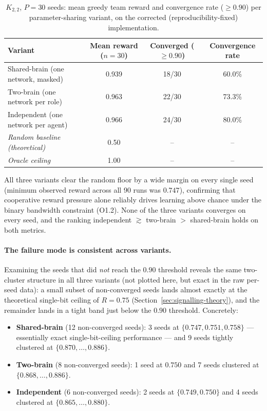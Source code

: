 \documentclass[a4paper,twoside,12pt]{report}
\begin{document}
\begin{table}[H]
\centering
\caption{$K_{2,2}$, $P=30$ seeds: mean greedy team reward and convergence
rate ($\geq 0.90$) per parameter-sharing variant, on the corrected
(reproducibility-fixed) implementation.}
\label{tab:q1-variant-comparison}
\renewcommand{\arraystretch}{1.25}
\begin{tabular}{lccc}
\toprule
\textbf{Variant} & \textbf{Mean reward ($n=30$)} & \textbf{Converged ($\geq 0.90$)} & \textbf{Convergence rate} \\
\midrule
Shared-brain (one network, masked)   & 0.939 & 18/30 & 60.0\% \\
Two-brain (one network per role)     & 0.963 & 22/30 & 73.3\% \\
Independent (one network per agent)  & 0.966 & 24/30 & 80.0\% \\
\midrule
\emph{Random baseline (theoretical)} & 0.50  & --    & -- \\
\emph{Oracle ceiling}                & 1.00  & --    & -- \\
\bottomrule
\end{tabular}
\end{table}

All three variants clear the random floor by a wide margin on every single
seed (minimum observed reward across all 90 runs was $0.747$), confirming
that cooperative reward pressure alone reliably drives learning above chance
under the binary bandwidth constraint (O1.2). None of the three variants
converges on every seed, and the ranking independent $\gtrsim$ two-brain $>$
shared-brain holds on both metrics.

\paragraph{The failure mode is consistent across variants.} Examining the
seeds that did \emph{not} reach the $0.90$ threshold reveals the same
two-cluster structure in all three variants (not plotted here, but exact in
the raw per-seed data): a small subset of non-converged seeds lands almost
exactly at the theoretical
single-bit ceiling of $R = 0.75$ (Section~\ref{sec:signalling-theory}), and
the remainder lands in a tight band just below the $0.90$ threshold.
Concretely:

\begin{itemize}
    \item \textbf{Shared-brain} (12 non-converged seeds): 3 seeds at
    $\{0.747, 0.751, 0.758\}$ --- essentially exact single-bit-ceiling
    performance --- and 9 seeds tightly clustered at $\{0.870,\ldots,0.886\}$.
    \item \textbf{Two-brain} (8 non-converged seeds): 1 seed at $0.750$ and
    7 seeds clustered at $\{0.868,\ldots,0.886\}$.
    \item \textbf{Independent} (6 non-converged seeds): 2 seeds at
    $\{0.749, 0.750\}$ and 4 seeds clustered at $\{0.865,\ldots,0.880\}$.
\end{itemize}
\end{document}

